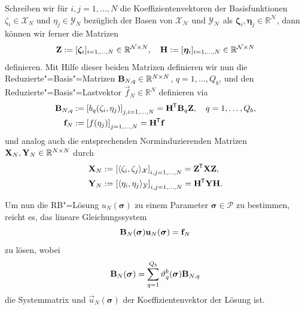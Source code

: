 \documentclass[../main.tex]{subfiles}
\begin{document}
Schreiben wir für $i,j = 1, \dots, N$ die Koeffizientenvektoren der Basisfunktionen $\zeta_{i} \in \mathcal X_{N}$ und $\eta_{j} \in \mathcal Y_{N}$ bezüglich der Basen von $\mathcal X_{\mathcal N}$ und $\mathcal Y_{\mathcal N}$  als $\bm \zeta_{i}, \bm \eta_{j} \in \mathbb{R}^{\mathcal N}$, dann können wir ferner die Matrizen
\begin{equation}
  \mathbf{Z} := [\bm \zeta_{i}]_{i = 1, \dots, N} \in \mathbb{R}^{\mathcal N \times N}, \quad \mathbf{H} := [\bm \eta_{i}]_{i = 1, \dots, N} \in \mathbb{R}^{\mathcal N \times N}
\end{equation}
definieren.
Mit Hilfe dieser beiden Matrizen definieren wir nun die Reduzierte"=Basis"=Matrizen $\mathbf{B}_{N, q} \in \mathbb{R}^{N \times N}$, $q = 1, \dots, Q_{b}$, und den Reduzierte"=Basis"=Lastvektor $\vec{f}_{N} \in \mathbb{R}^{N}$ definieren via
\begin{equation}
    \begin{aligned}
        \mathbf{B}_{N,q} &:= \left[ b_{q}(\zeta_{i}, \eta_{j}) \right]_{j, i = 1, \dots, N} = \mathbf{H}^{\mkern-1.5mu\mathsf{T}} \mathbf{B}_{q} \mathbf{Z}, \quad q = 1, \dots, Q_{b}, \\
        \mathbf{f}_{N} &:= \left[ f(\eta_{j}) \right]_{j = 1, \dots, N} = \mathbf{H}^{\mkern-1.5mu\mathsf{T}} \mathbf{f}
    \end{aligned}
\end{equation}
und analog auch die entsprechenden Norminduzierenden Matrizen $\mathbf{X}_{N}, \mathbf{Y}_{N} \in \mathbb{R}^{N \times N}$ durch
\begin{equation}
    \begin{aligned}
    \mathbf{X}_{N} &:= \left[ \langle\zeta_{i},\zeta_{j}\rangle_{\mathcal X} \right]_{i,j = 1, \dots, N} = \mathbf{Z}^{\mkern-1.5mu\mathsf{T}} \mathbf{X} \mathbf{Z}, \\
    \mathbf{Y}_{N} &:= \left[ \langle\eta_{i},\eta_{j}\rangle_{\mathcal Y} \right]_{i,j = 1, \dots, N} = \mathbf{H}^{\mkern-1.5mu\mathsf{T}} \mathbf{Y} \mathbf{H}.
    \end{aligned}
\end{equation}

Um nun die RB"=Lösung $u_{N}(\bm \sigma)$ zu einem Parameter $\bm \sigma \in \mathcal P$ zu bestimmen, reicht es, das lineare Gleichungssystem
\begin{equation}
\label{eq:rbm_gleichungssystem}
    \mathbf{B}_{N}(\bm \sigma) \mathbf{u}_{N}(\bm \sigma) = \mathbf{f}_{N}
\end{equation}
zu lösen, wobei
\begin{equation}
\label{eq:affine_rbm_systemmatrix}
    \mathbf{B}_{N}(\bm \sigma) = \sum_{q = 1}^{Q_b} \vartheta_{q}^{b}(\bm \sigma) \mathbf{B}_{N, q}
\end{equation}
die Systemmatrix und $\vec{u}_{N}(\bm \sigma)$ der Koeffizientenvektor der Lösung ist.
\end{document}
